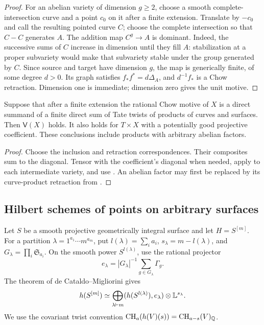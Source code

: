 \begin{proof}
For an abelian variety of dimension $g\geq2$, choose a smooth
complete-intersection curve and a point $c_0$ on it after a finite
extension. Translate by $-c_0$ and call the resulting pointed curve
$C$; choose the complete intersection so that $C-C$ generates $A$.
The addition map $C^g\to A$ is dominant. Indeed,
the successive sums of $C$ increase in dimension until they fill
$A$: stabilization at a proper subvariety would make that subvariety
stable under the group generated by $C$. Since source and target
have dimension $g$, the map is generically finite, of some degree
$d>0$. Its graph satisfies $f_*f^*=d\Delta_A$, and
$d^{-1}f_*$ is a Chow retraction. Dimension one is immediate;
dimension zero gives the unit motive.
\end{proof}

\begin{corollary}\label{cor:surface-envelope}
Suppose that after a finite extension the rational Chow motive of
$X$ is a direct summand of a finite direct sum of Tate twists of
products of curves and surfaces. Then $\mathsf V(X)$ holds. It also
holds for $T\times X$ with a potentially good projective coefficient.
These conclusions include products with arbitrary abelian factors.
\end{corollary}

\begin{proof}
Choose the inclusion and retraction correspondences. Their composites
sum to the diagonal. Tensor with the coefficient's diagonal when
needed, apply  to each intermediate variety,
and use . An abelian factor may first be
replaced by its curve-product retraction from
.
\end{proof}

\subsection{Hilbert schemes of points on arbitrary surfaces}

Let $S$ be a smooth projective geometrically integral surface and
let $H=S^{[m]}$. For a
partition $\lambda=1^{a_1}\cdots m^{a_m}$, put
$l(\lambda)=\sum_i a_i$, $s_\lambda=m-l(\lambda)$, and
$G_\lambda=\prod_i\mathfrak S_{a_i}$. On the smooth power
$S^{l(\lambda)}$, use the rational projector
\[
 e_\lambda=|G_\lambda|^{-1}\sum_{g\in G_\lambda}\Gamma_g.
\]
The theorem of de Cataldo--Migliorini
\cite[Theorem 6.2.1 and Remark 6.2.2]{DCM} gives
\begin{equation}\label{eq:hilbert-motive}
 h(S^{[m]})\simeq\bigoplus_{\lambda\vdash m}
       (h(S^{l(\lambda)}),e_\lambda)\otimes\mathbb L^{s_\lambda}.
\end{equation}
We use the covariant twist convention
$\operatorname{CH}_a(h(V)(s))=\operatorname{CH}_{a-s}(V)_\mathbb Q$.

